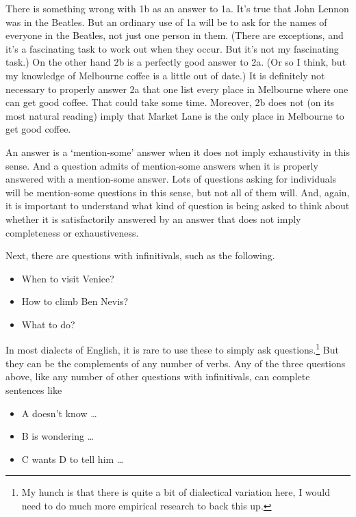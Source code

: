 \documentclass[
  11pt,
]{book}
\providecommand{\tightlist}{%
  \setlength{\itemsep}{0pt}\setlength{\parskip}{0pt}}
\begin{document}
There is something wrong with 1b as an answer to 1a. It's true that John Lennon was in the Beatles. But an ordinary use of 1a will be to ask for the names of everyone in the Beatles, not just one person in them. (There are exceptions, and it's a fascinating task to work out when they occur. But it's not my fascinating task.) On the other hand 2b is a perfectly good answer to 2a. (Or so I think, but my knowledge of Melbourne coffee is a little out of date.) It is definitely not necessary to properly answer 2a that one list every place in Melbourne where one can get good coffee. That could take some time. Moreover, 2b does not (on its most natural reading) imply that Market Lane is the only place in Melbourne to get good coffee.

An answer is a `mention-some' answer when it does not imply exhaustivity in this sense. And a question admits of mention-some answers when it is properly answered with a mention-some answer. Lots of questions asking for individuals will be mention-some questions in this sense, but not all of them will. And, again, it is important to understand what kind of question is being asked to think about whether it is satisfactorily answered by an answer that does not imply completeness or exhaustiveness.

Next, there are questions with infinitivals, such as the following.

\begin{itemize}
\tightlist
\item
  When to visit Venice?
\item
  How to climb Ben Nevis?
\item
  What to do?
\end{itemize}

In most dialects of English, it is rare to use these to simply ask questions.\footnote{My hunch is that there is quite a bit of dialectical variation here, I would need to do much more empirical research to back this up.} But they can be the complements of any number of verbs. Any of the three questions above, like any number of other questions with infinitivals, can complete sentences like

\begin{itemize}
\tightlist
\item
  A doesn't know \ldots{}
\item
  B is wondering \ldots{}
\item
  C wants D to tell him \ldots{}
\end{itemize}
\end{document}
